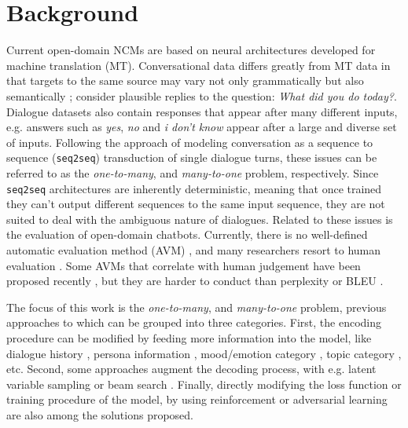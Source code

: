 \documentclass[11pt,a4paper]{article}
\begin{document}
\section{Background}
\label{sec:background}
Current open-domain NCMs are based on neural architectures developed
for machine translation (MT). Conversational data differs
greatly from MT data in that targets to the same source may vary not
only grammatically but also semantically
\cite{Wei:2017,Tandon:2017}; consider plausible replies to
the question: \textit{What did you do today?}. Dialogue datasets also
contain responses that appear after many different inputs, e.g. answers
such as \textit{yes}, \textit{no} and \textit{i don't
  know} appear after a large and diverse set of inputs.
Following the approach of modeling conversation as a sequence to sequence (\texttt{seq2seq})
\cite{Sutskever:2014} transduction of single dialogue turns, these
issues can be referred to as the
\textit{one-to-many}, and \textit{many-to-one} problem, respectively. Since
\texttt{seq2seq} architectures are inherently deterministic, meaning that once trained
they can't output different sequences to the same input sequence, they are not
suited to deal with the ambiguous nature of dialogues.
Related to these issues is the evaluation of open-domain
chatbots. Currently, there is no well-defined automatic evaluation method
(AVM) \cite{Liu:2016}, and many researchers resort to human evaluation
\cite{Vinyals:2015d, Serban:2017a, Ram:2018}. Some AVMs
that correlate with human judgement have been proposed recently
\cite{Li:2017a, Lowe:2017}, but they are harder to conduct than perplexity or BLEU \cite{Papineni:2002}.

The focus of this work is the \textit{one-to-many}, and \textit{many-to-one} problem,
previous approaches to which can be grouped into three
categories. First, the encoding procedure can be modified by feeding more
information into the model, like dialogue history \cite{Serban:2015}, persona
information \cite{Li:2016a,Joshi:2017,Zhang:2018}, mood/emotion category
\cite{Zhou:2017,Li:2017b}, topic category \cite{Xing:2017, Liu:2017}, etc. Second, some approaches augment the decoding process, with
e.g. latent variable sampling \cite{Serban:2017b,Zhao:2017} or
beam search \cite{Goyal:2017,Wiseman:2016,Shao:2017b}. Finally, directly
modifying the loss function \cite{Wiseman:2016} or training procedure of the
model, by using reinforcement \cite{Li:2016b,
  Serban:2017a,Li:2016c,Lipton:2017} or adversarial learning \cite{Li:2017a} are also
  among the solutions proposed.
\end{document}
